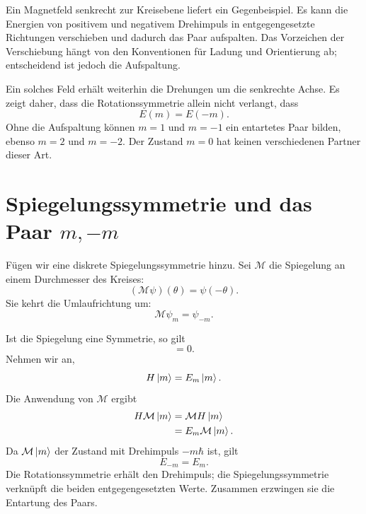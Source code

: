 Ein Magnetfeld senkrecht zur Kreisebene liefert ein Gegenbeispiel. Es kann die Energien von positivem und negativem Drehimpuls in entgegengesetzte Richtungen verschieben und dadurch das Paar aufspalten. Das Vorzeichen der Verschiebung hängt von den Konventionen für Ladung und Orientierung ab; entscheidend ist jedoch die Aufspaltung.

Ein solches Feld erhält weiterhin die Drehungen um die senkrechte Achse. Es zeigt daher, dass die Rotationssymmetrie allein nicht verlangt, dass
\begin{equation}
E(m)=E(-m).
\end{equation}
Ohne die Aufspaltung können \(m=1\) und \(m=-1\) ein entartetes Paar bilden, ebenso \(m=2\) und \(m=-2\). Der Zustand \(m=0\) hat keinen verschiedenen Partner dieser Art.

\section{Spiegelungssymmetrie und das Paar \texorpdfstring{\(m,-m\)}{m, -m}}

Fügen wir eine diskrete Spiegelungssymmetrie hinzu. Sei \(\mathcal M\) die Spiegelung an einem Durchmesser des Kreises:
\begin{equation}
(\mathcal M\psi)(\theta)=\psi(-\theta).
\end{equation}
Sie kehrt die Umlaufrichtung um:
\begin{equation}
\mathcal M\psi_m=\psi_{-m}.
\end{equation}

Ist die Spiegelung eine Symmetrie, so gilt
\begin{equation}
[\mathcal M,H]=0.
\end{equation}
Nehmen wir an,
\begin{equation}
H\left\lvert m\right\rangle=E_m\left\lvert m\right\rangle.
\end{equation}
Die Anwendung von \(\mathcal M\) ergibt
\begin{align}
H\mathcal M\left\lvert m\right\rangle
&=\mathcal M H\left\lvert m\right\rangle\\
&=E_m\mathcal M\left\lvert m\right\rangle.
\end{align}
Da \(\mathcal M\left\lvert m\right\rangle\) der Zustand mit Drehimpuls \(-m\hbar\) ist, gilt
\begin{equation}
E_{-m}=E_m.
\end{equation}
Die Rotationssymmetrie erhält den Drehimpuls; die Spiegelungssymmetrie verknüpft die beiden entgegengesetzten Werte. Zusammen erzwingen sie die Entartung des Paars.

\begin{classroomqa}
\end{classroomqa}


